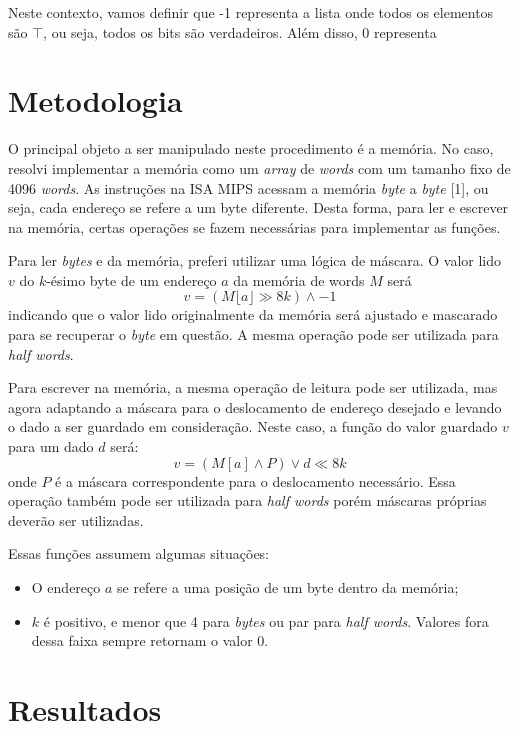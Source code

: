 \documentclass[12pt, a4paper, twoside]{article}
\begin{document}
Neste contexto, vamos definir que -1 representa a lista onde todos os elementos
são $ \top $, ou seja, todos os bits são verdadeiros. Além disso, 0 representa

\section{Metodologia}

O principal objeto a ser manipulado neste procedimento é a memória. No caso,
resolvi implementar a memória como um \textit{array} de \textit{words} com um
tamanho fixo de 4096 \textit{words}. As instruções na ISA MIPS acessam a
memória \textit{byte} a \textit{byte} [1], ou seja, cada endereço se refere a
um byte diferente. Desta forma, para ler e escrever na memória, certas
operações se fazem necessárias para implementar as funções.

Para ler \textit{bytes} e da memória, preferi utilizar uma lógica de máscara.
O valor lido $v$ do $k$-ésimo byte de um endereço $a$ da memória de words $M$
será
$$ v = \left( M \lfloor a \rfloor \gg 8k \right) \land -1 $$
indicando que o valor lido originalmente da memória será ajustado e mascarado
para se recuperar o \textit{byte} em questão. A mesma operação pode ser
utilizada para \textit{half words}.

Para escrever na memória, a mesma operação de leitura pode ser utilizada, mas
agora adaptando a máscara para o deslocamento de endereço desejado e levando o
dado a ser guardado em consideração. Neste caso, a função do valor guardado $v$
para um dado $d$ será:
$$ v = \left( M[a] \land P \right) \lor d \ll 8k $$
onde $P$ é a máscara correspondente para o deslocamento necessário. Essa
operação também pode ser utilizada para \textit{half words} porém máscaras
próprias deverão ser utilizadas.

Essas funções assumem algumas situações:

\begin{itemize}
    \item O endereço $a$ se refere a uma posição de um byte dentro da memória;
    \item $k$ é positivo, e menor que 4 para \textit{bytes} ou par para
    \textit{half words}. Valores fora dessa faixa sempre retornam o valor 0.
\end{itemize}

\section{Resultados}
\end{document}
